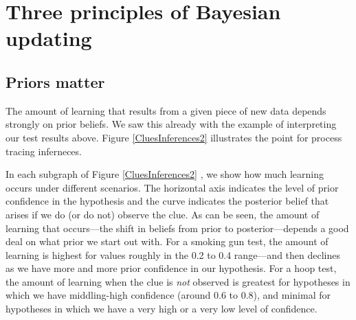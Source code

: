 \documentclass[12pt,]{book}
\begin{document}
\hypertarget{three-principles-of-bayesian-updating}{%
\section{Three principles of Bayesian updating}\label{three-principles-of-bayesian-updating}}

\hypertarget{AppPriors}{%
\subsection{Priors matter}\label{AppPriors}}

The amount of learning that results from a given piece of new data depends strongly on prior beliefs. We saw this already with the example of interpreting our test results above. Figure \ref{CluesInferences2} illustrates the point for process tracing inferneces.

In each subgraph of Figure \ref{CluesInferences2} , we show how much learning occurs under different scenarios. The horizontal axis indicates the level of prior confidence in the hypothesis and the curve indicates the posterior belief that arises if we do (or do not) observe the clue. As can be seen, the amount of learning that occurs---the shift in beliefs from prior to posterior---depends a good deal on what prior we start out with. For a smoking gun test, the amount of learning is highest for values roughly in the 0.2 to 0.4 range---and then declines as we have more and more prior confidence in our hypothesis. For a hoop test, the amount of learning when the clue is \emph{not} observed is greatest for hypotheses in which we have middling-high confidence (around 0.6 to 0.8), and minimal for hypotheses in which we have a very high or a very low level of confidence.
\end{document}
